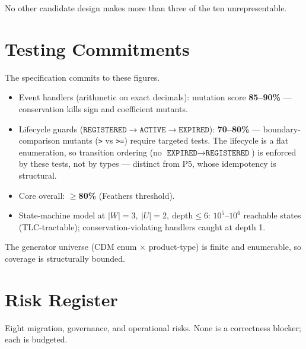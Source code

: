 \documentclass[11pt,a4paper]{article}
\begin{document}
\noindent No other candidate design makes more than three of the ten unrepresentable.

\section{Testing Commitments}
\label{sec:mutationscore}

The specification commits to these figures.

\begin{itemize}[leftmargin=*]
\item Event handlers (arithmetic on exact decimals): mutation score \textbf{85--90\%} ---
conservation kills sign and coefficient mutants.
\item Lifecycle guards ($\texttt{REGISTERED}\to\texttt{ACTIVE}\to\texttt{EXPIRED}$):
\textbf{70--80\%} --- boundary-comparison mutants (\texttt{>} vs \texttt{>=}) require
targeted tests. The lifecycle is a flat enumeration, so transition ordering (no
$\texttt{EXPIRED}\to\texttt{REGISTERED}$) is enforced by these tests, not by types --- distinct
from P5, whose idempotency is structural.
\item Core overall: $\geq$\textbf{80\%} (Feathers threshold).
\item State-machine model at $|W|=3,\ |U|=2,\ \text{depth}\leq 6$: $10^5$--$10^6$ reachable
states (TLC-tractable); conservation-violating handlers caught at depth 1.
\end{itemize}

\noindent The generator universe (CDM enum $\times$ product-type) is finite and enumerable,
so coverage is structurally bounded.

\section{Risk Register}
\label{sec:risk}

Eight migration, governance, and operational risks. None is a correctness blocker; each is
budgeted.
\end{document}
